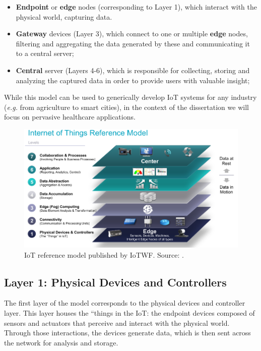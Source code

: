 \begin{itemize}
    \item \textbf{Endpoint} or \textbf{edge} nodes (corresponding to Layer 1), which interact with the physical world, capturing data.
    \item \textbf{Gateway} devices (Layer 3), which connect to one or multiple \textbf{edge} nodes, filtering and aggregating the data generated by these and communicating it to a central server; 
    \item \textbf{Central} server (Layers 4-6), which is responsible for collecting, storing and analyzing the captured data in order to provide users with valuable insight;
\end{itemize}

While this model can be used to generically develop \acs{IoT} systems for any industry (\textit{e.g.} from agriculture to smart cities), in the context of the dissertation we will focus on pervasive healthcare applications. \bigskip


\begin{figure}[H]
    \centering
    \includegraphics[width=0.85\linewidth]{images/iotwf-referencemodel.png}
    \caption[IoT reference model published by IoTWF.]{IoT reference model published by IoTWF. Source: \cite{Cisco2014}.}
    \label{fig:iotwf-referencemodel}
\end{figure}

\subsection{Layer 1: Physical Devices and Controllers}
\label{sec:iot-model-layer1}

The first layer of the model \cite{Cisco2014} corresponds to the physical devices and controller layer. This layer houses the ``things in the \acl{IoT}: the endpoint devices composed of sensors and actuators that perceive and interact with the physical world. Through those interactions, the devices generate data, which is then sent across the network for analysis and storage. \bigskip

